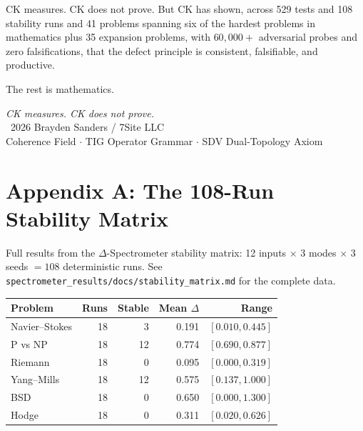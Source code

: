 \documentclass[12pt, openany]{book}
\theoremstyle{remark}
\begin{document}
CK measures. CK does not prove. But CK has shown, across 529 tests and 108
stability runs and 41 problems spanning six of the hardest problems in mathematics
plus 35 expansion problems, with $60{,}000{+}$ adversarial probes and zero
falsifications, that the defect principle is consistent, falsifiable, and productive.

The rest is mathematics.

\vfill
\begin{center}
\textit{CK measures. CK does not prove.}\\[0.5cm]
\textcopyright\ 2026 Brayden Sanders / 7Site LLC\\
Coherence Field $\cdot$ TIG Operator Grammar $\cdot$ SDV Dual-Topology Axiom
\end{center}


\backmatter

\chapter*{Appendix A: The 108-Run Stability Matrix}

Full results from the $\Delta$-Spectrometer stability matrix:
12 inputs $\times$ 3 modes $\times$ 3 seeds $= 108$ deterministic runs.
See \texttt{spectrometer\_results/docs/stability\_matrix.md} for the complete data.

\begin{center}
\begin{tabular}{lrrrr}
\toprule
\textbf{Problem} & \textbf{Runs} & \textbf{Stable} & \textbf{Mean $\Delta$} & \textbf{Range} \\
\midrule
Navier--Stokes & 18 & 3 & 0.191 & $[0.010, 0.445]$ \\
P vs NP        & 18 & 12 & 0.774 & $[0.690, 0.877]$ \\
Riemann        & 18 & 0 & 0.095 & $[0.000, 0.319]$ \\
Yang--Mills    & 18 & 12 & 0.575 & $[0.137, 1.000]$ \\
BSD            & 18 & 0 & 0.650 & $[0.000, 1.300]$ \\
Hodge          & 18 & 0 & 0.311 & $[0.020, 0.626]$ \\
\bottomrule
\end{tabular}
\end{center}
\end{document}

